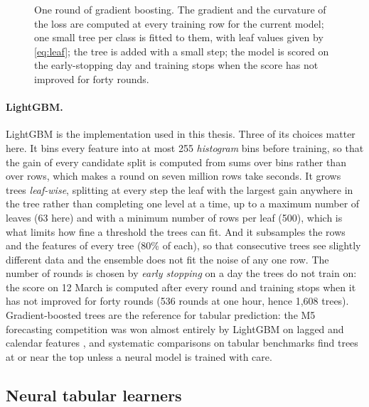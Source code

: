 \begin{figure}[t]
\centering
\resizebox{\textwidth}{!}{}
\caption{One round of gradient boosting.  The gradient and the curvature of the loss are
computed at every training row for the current model; one small tree per class is fitted
to them, with leaf values given by \cref{eq:leaf}; the tree is added with a small step;
the model is scored on the early-stopping day and training stops when the score has not
improved for forty rounds.}
\label{fig:bg:boosting}
\end{figure}

\paragraph{LightGBM.}  LightGBM \cite{ke2017lightgbm} is the implementation used in this
thesis.  Three
of its choices matter here.  It bins every feature into at most 255 \emph{histogram} bins
before training, so that the gain of every candidate split is computed from sums over
bins rather than over rows, which makes a round on seven million rows take seconds.  It
grows trees \emph{leaf-wise}, splitting at every step the leaf with the largest gain
anywhere in the tree rather than completing one level at a time, up to a maximum number of
leaves (63 here) and with a minimum number of rows per leaf (500), which is what limits
how fine a threshold the trees can fit.  And it subsamples the rows and the features of
every tree (80\% of each), so that consecutive trees see slightly different data and the
ensemble does not fit the noise of any one row.  The number of rounds is chosen by
\emph{early stopping} on a day the trees do not train on: the score on 12 March is
computed after every round and training stops when it has not improved for forty rounds
(536 rounds at one hour, hence 1{,}608 trees).  Gradient-boosted trees are the reference
for tabular prediction: the M5 forecasting competition was won almost entirely by LightGBM
on lagged and calendar features \cite{makridakis2022m5}, and systematic comparisons on
tabular benchmarks find trees at or near the top unless a neural model is trained with
care.

\subsection{Neural tabular learners}
\label{sec:bg:tabnets}

